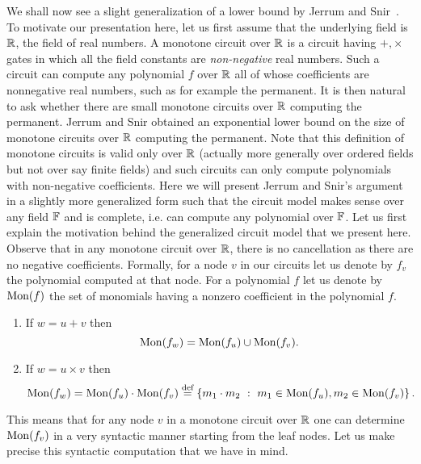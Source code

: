 We shall now see a  slight generalization of a lower bound by Jerrum and Snir~\cite{js82}.  To motivate our presentation here, let us first assume that the underlying field is $\mathbb{R}$, the field of real numbers. A monotone circuit over $\mathbb{R}$ is a circuit having $+, \times$ gates in which all the field constants are {\em non-negative} real numbers. Such a circuit can compute any polynomial $f$ over $\mathbb{R}$ all of whose coefficients are nonnegative real numbers, such as for example the permanent. It is then natural to ask whether there are small monotone circuits over $\mathbb{R}$ computing the permanent. Jerrum and Snir \cite{js82} obtained an exponential lower bound on the size of monotone circuits over $\mathbb{R}$ computing the permanent. Note that this definition of monotone circuits is valid only over $\mathbb{R}$ (actually more generally over ordered fields but not over say finite fields) and such circuits can only compute polynomials with non-negative coefficients. Here we will present Jerrum and Snir's argument in a slightly more generalized form such that the circuit model makes sense over any field $\mathbb{F}$ and is complete, i.e.  can compute any polynomial over $\mathbb{F}$. Let us first explain the motivation behind the generalized circuit model that we present here. Observe that in any monotone circuit over $\mathbb{R}$, there is no cancellation as there are no negative coefficients. Formally, for a node $v$ in our circuits let us denote by $f_{v}$ the polynomial computed at that node. For a polynomial $f$ let us denote by $\mathrm{Mon}(f)$ the set of monomials having a nonzero coefficient in the polynomial $f$.
\begin{enumerate}
\item If $w = u + v$ then 
  $$ \mathrm{Mon}(f_{w}) = \mathrm{Mon}(f_{u}) \cup \mathrm{Mon}(f_{v}). $$
  
\item If $w = u \times v$ then
  $$ \mathrm{Mon}(f_{w}) = \mathrm{Mon}(f_{u}) \cdot \mathrm{Mon}(f_{v}) \stackrel{\text{def}}{=} \left\{{m_1\cdot m_2}\ : \ {m_1 \in \mathrm{Mon}(f_{u}), m_2\in \mathrm{Mon}(f_{v})}\right\}. $$
			
\end{enumerate}
This means that for any node $v$ in a monotone circuit over $\mathbb{R}$ one can determine $\mathrm{Mon}(f_{v})$ in a very syntactic manner starting from the leaf nodes. Let us make precise this syntactic computation that we have in mind.

